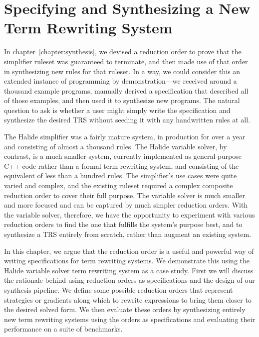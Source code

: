 \chapter{Specifying and Synthesizing a New Term Rewriting System}
\label{chapter:synthfromscratch}

In chapter~\ref{chapter:synthesis}, we devised a reduction order to prove that the simplifier ruleset was guaranteed to terminate, and then made use of that order in synthesizing new rules for that ruleset. In a way, we could consider this an extended instance of programming by demonstration---we received around a thousand example programs, manually derived a specification that described all of those examples, and then used it to synthesize new programs. The natural question to ask is whether a user might simply write the specification and synthesize the desired TRS without seeding it with any handwritten rules at all.

The Halide simplifier was a fairly mature system, in production for over a year and consisting of almost a thousand rules. The Halide variable solver, by contrast, is a much smaller system, currently implemented as general-purpose C++ code rather than a formal term rewriting system, and consisting of the equivalent of less than a hundred rules. The simplifier's use cases were quite varied and complex, and the existing ruleset required a complex composite reduction order to cover their full purpose. The variable solver is much smaller and more focused and can be captured by much simpler reduction orders. With the variable solver, therefore, we have the opportunity to experiment with various reduction orders to find the one that fulfills the system's purpose best, and to synthesize a TRS entirely from scratch, rather than augment an existing system.

In this chapter, we argue that the reduction order is a useful and powerful way of writing specifications for term rewriting systems. We demonstrate this using the Halide variable solver term rewriting system as a case study. First we will discuss the rationale behind using reduction orders as specifications and the design of our synthesis pipeline. We define some possible reduction orders that represent strategies or gradients along which to rewrite expressions to bring them closer to the desired solved form. We then evaluate these orders by synthesizing entirely new term rewriting systems using the orders as specifications and evaluating their performance on a suite of benchmarks.






